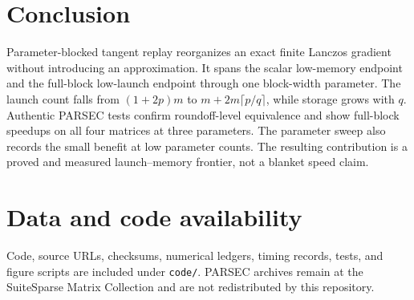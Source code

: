 \documentclass[10pt,letterpaper,twoside]{article}
\begin{document}
\section{Conclusion}

Parameter-blocked tangent replay reorganizes an exact finite Lanczos gradient
without introducing an approximation.  It spans the scalar low-memory
endpoint and the full-block low-launch endpoint through one block-width
parameter.  The launch count falls from $(1+2p)m$ to
$m+2m\lceil p/q\rceil$, while storage grows with $q$.  Authentic PARSEC tests
confirm roundoff-level equivalence and show full-block speedups on all four
matrices at three parameters.  The parameter sweep also records the small
benefit at low parameter counts.  The resulting contribution
is a proved and measured launch--memory frontier, not a blanket speed claim.

\section*{Data and code availability}

Code, source URLs, checksums, numerical ledgers, timing records, tests, and
figure scripts are included under \texttt{code/}.  PARSEC archives remain at
the SuiteSparse Matrix Collection and are not redistributed by this
repository.

\begingroup
\small


\endgroup
\end{document}
